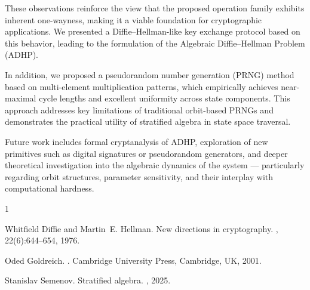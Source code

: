 \documentclass[12pt]{article}
\theoremstyle{definition}
\theoremstyle{plain}
\theoremstyle{remark}
\begin{document}
These observations reinforce the view that the proposed operation family exhibits inherent one-wayness, making it a viable foundation for cryptographic applications. We presented a Diffie–Hellman-like key exchange protocol based on this behavior, leading to the formulation of the Algebraic Diffie–Hellman Problem (ADHP).

In addition, we proposed a pseudorandom number generation (PRNG) method based on multi-element multiplication patterns, which empirically achieves near-maximal cycle lengths and excellent uniformity across state components. This approach addresses key limitations of traditional orbit-based PRNGs and demonstrates the practical utility of stratified algebra in state space traversal.

Future work includes formal cryptanalysis of ADHP, exploration of new primitives such as digital signatures or pseudorandom generators, and deeper theoretical investigation into the algebraic dynamics of the system — particularly regarding orbit structures, parameter sensitivity, and their interplay with computational hardness.

% 
% 

\begin{thebibliography}{1}

Whitfield Diffie and Martin~E. Hellman.
\newblock New directions in cryptography.
, 22(6):644--654, 1976.

Oded Goldreich.
.
\newblock Cambridge University Press, Cambridge, UK, 2001.

Stanislav Semenov.
\newblock Stratified algebra.
, 2025.

\end{thebibliography}
\end{document}
